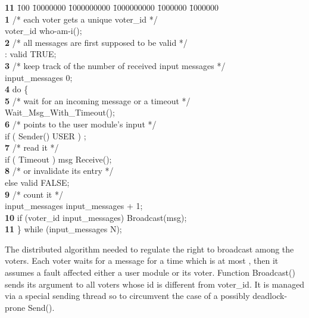 \documentclass[11pt]{article}
\begin{document}
\begin{table}[h]
\begin{small}
\begin{sf}
\hrulefill
\vspace*{-12pt}
\begin{tabbing}
{\bf 11} \= 100 \= 10000000 \= 1000000000 \= 1000000000 \= 1000000 \= 1000000\kill\\
{\bf 1} \> /* each voter gets a unique voter\_id  */ \\
        \> voter\_id  who-am-i();\\
{\bf 2} \> /* all messages are first supposed to be valid */\\
        \>  : valid TRUE; \\
{\bf 3} \> /* keep track of the number of received input messages */\\
        \>  input\_messages  0;\\
{\bf 4} \> do \{ \\
{\bf 5} \>\> /* wait for an incoming message or a timeout */\\
        \> \> Wait\_Msg\_With\_Timeout();\\
{\bf 6} \>\>/*  points to the user module's input */\\
        \>\> if ( Sender()  USER ) ; \\
{\bf 7} \>\>/* read it */\\
        \>\> if (  Timeout ) msg Receive(); \\
{\bf 8} \>\>/* or invalidate its entry */\\
        \>\> else valid  FALSE; \\
{\bf 9} \>\>/* count it */\\
        \>\>  input\_messages  input\_messages + 1;\\
{\bf 10} \> \> if (voter\_id  input\_messages) Broadcast(msg);\\
{\bf 11}\> \} while (input\_messages  N);
\end{tabbing}
\vspace*{-5pt}
\hrulefill
\end{sf}
\end{small}
\caption{The distributed algorithm needed to regulate the right to
broadcast among the  voters. Each voter waits for a message
for a time which is at most , then it assumes a fault affected
either a user module or its voter. Function {\sf Broadcast()} 
sends its argument to all voters whose id is different from
{\sf voter\_id}. It is managed via a special sending thread so to
circumvent the case of a possibly deadlock-prone {\sf Send()}.}
\label{broadcast}
\end{table}
\end{document}

